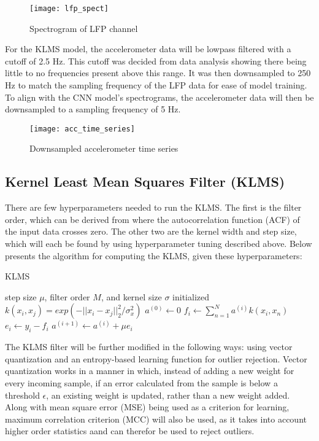 \documentclass[12pt]{article}
\begin{document}
\begin{figure}[h]
\caption{Spectrogram of LFP channel}
\centering
\texttt{[image: lfp\_spect]}
\end{figure}

For the KLMS model, the accelerometer data will be lowpass filtered with a cutoff of 2.5 Hz. This cutoff was decided from data analysis showing there being little to no frequencies present above this range. It was then downsampled to 250 Hz to match the sampling frequency of the LFP data for ease of model training. To align with the CNN model's spectrograms, the accelerometer data will then be downsampled to a sampling frequency of 5 Hz.

\begin{figure}[h]
\caption{Downsampled accelerometer time series}
\centering
\texttt{[image: acc\_time\_series]}
\end{figure}

\subsection{Kernel Least Mean Squares Filter (KLMS)}

There are few hyperparameters needed to run the KLMS. The first is the filter order, which can be derived from where the autocorrelation function (ACF) of the input data crosses zero. The other two are the kernel width and step size, which will each be found by using hyperparameter tuning described above. Below presents the algorithm for computing the KLMS, given these hyperparameters:

\begin{algorithm}
\caption{KLMS}\label{alg:cap}
\begin{algorithmic}
   \Require step size $\mu$, filter order $M$, and kernel size
   $\sigma$ initialized  
   \State $k(x_i, x_j) = exp(-|| x_i - x_j ||^2_2 / \sigma^2_x)$
   \State $a^{(0)} \gets 0$  
     \State $f_i \gets \sum_{n=1}^{N} a^{(i)} k(x_i, x_n)$\   
     \State $e_i \gets y_i - f_i$    
     \State $a^{(i+1)} \gets a^{(i)} + \mu e_i$   
   \EndFor 
\end{algorithmic}
\end{algorithm}

The KLMS filter will be further modified in the following ways: using vector quantization and an entropy-based learning function for outlier rejection. Vector quantization works in a manner in which, instead of adding a new weight for every incoming sample, if an error calculated from the sample is below a threshold $\epsilon$, an existing weight is updated, rather than a new weight added. Along with mean square error (MSE) being used as a criterion for learning, maximum correlation criterion (MCC) will also be used, as it takes into account higher order statistics aand can therefor be used to reject outliers.
\end{document}
